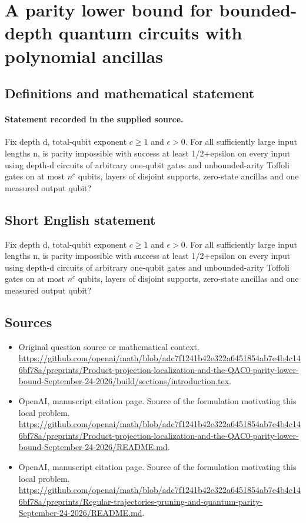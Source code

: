 \documentclass[11pt]{article}
\begin{document}
\section*{A parity lower bound for bounded-depth quantum circuits with polynomial ancillas}\label{30007243}
\subsection{Definitions and mathematical statement}
\paragraph{Statement recorded in the supplied source.}
Fix depth d, total-qubit exponent $c\geq 1$ and $\epsilon >0$. For all sufficiently large input lengths n, is parity impossible with success at least 1/2+epsilon on every input using depth-d circuits of arbitrary one-qubit gates and unbounded-arity Toffoli gates on at most $n^c$ qubits, layers of disjoint supports, zero-state ancillas and one measured output qubit?
\subsection{Short English statement}
Fix depth d, total-qubit exponent $c\geq 1$ and $\epsilon >0$. For all sufficiently large input lengths n, is parity impossible with success at least 1/2+epsilon on every input using depth-d circuits of arbitrary one-qubit gates and unbounded-arity Toffoli gates on at most $n^c$ qubits, layers of disjoint supports, zero-state ancillas and one measured output qubit?
\subsection{Sources}
\begin{itemize}
\item[S1] Original question source or mathematical context.
\url{https://github.com/openai/math/blob/adc7f1241b42e322a6451854ab7e4b4c146bf78a/preprints/Product-projection-localization-and-the-QAC0-parity-lower-bound-September-24-2026/build/sections/introduction.tex}.
\item[S2] OpenAI, manuscript citation page. Source of the formulation motivating this local problem.
\url{https://github.com/openai/math/blob/adc7f1241b42e322a6451854ab7e4b4c146bf78a/preprints/Product-projection-localization-and-the-QAC0-parity-lower-bound-September-24-2026/README.md}.
\item[S3] OpenAI, manuscript citation page. Source of the formulation motivating this local problem.
\url{https://github.com/openai/math/blob/adc7f1241b42e322a6451854ab7e4b4c146bf78a/preprints/Regular-trajectories-pruning-and-quantum-parity-September-24-2026/README.md}.
\end{itemize}
\end{document}
